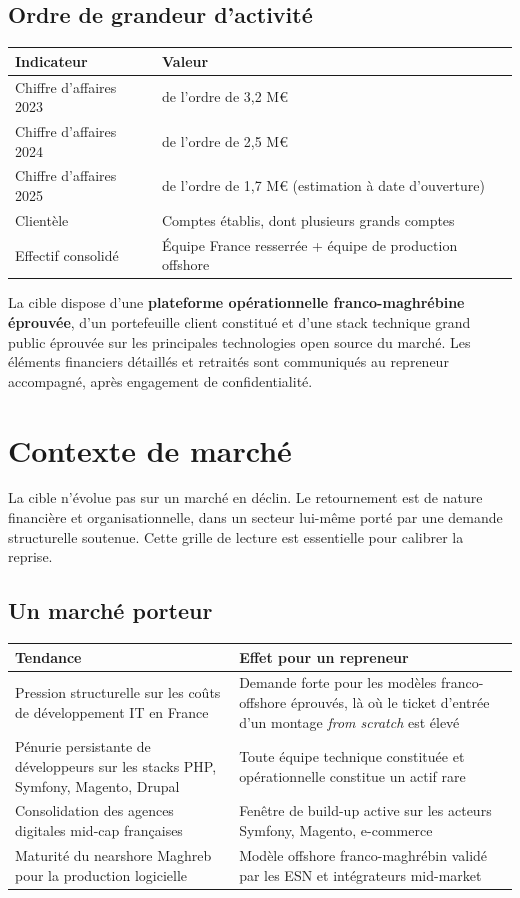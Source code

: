 \documentclass[11pt,a4paper]{article}
\begin{document}
\subsection*{Ordre de grandeur d'activité}

\begin{tabular}{L{6cm}L{8cm}}
\toprule
\textbf{Indicateur} & \textbf{Valeur} \\
\midrule
Chiffre d'affaires 2023 & de l'ordre de 3,2 M\euro{} \\
Chiffre d'affaires 2024 & de l'ordre de 2,5 M\euro{} \\
Chiffre d'affaires 2025 & de l'ordre de 1,7 M\euro{} (estimation à date d'ouverture) \\
Clientèle & Comptes établis, dont plusieurs grands comptes \\
Effectif consolidé & Équipe France resserrée + équipe de production offshore \\
\bottomrule
\end{tabular}

La cible dispose d'une \textbf{plateforme opérationnelle franco-maghrébine éprouvée}, d'un portefeuille client constitué et d'une stack technique grand public éprouvée sur les principales technologies open source du marché. Les éléments financiers détaillés et retraités sont communiqués au repreneur accompagné, après engagement de confidentialité.

\section{Contexte de marché}

La cible n'évolue pas sur un marché en déclin. Le retournement est de nature financière et organisationnelle, dans un secteur lui-même porté par une demande structurelle soutenue. Cette grille de lecture est essentielle pour calibrer la reprise.

\subsection{Un marché porteur}

\begin{longtable}{L{6.5cm}L{8.5cm}}
\toprule
\textbf{Tendance} & \textbf{Effet pour un repreneur} \\
\midrule
\endhead
Pression structurelle sur les coûts de développement IT en France & Demande forte pour les modèles franco-offshore éprouvés, là où le ticket d'entrée d'un montage \textit{from scratch} est élevé \\
Pénurie persistante de développeurs sur les stacks PHP, Symfony, Magento, Drupal & Toute équipe technique constituée et opérationnelle constitue un actif rare \\
Consolidation des agences digitales mid-cap françaises & Fenêtre de build-up active sur les acteurs Symfony, Magento, e-commerce \\
Maturité du nearshore Maghreb pour la production logicielle & Modèle offshore franco-maghrébin validé par les ESN et intégrateurs mid-market \\
\bottomrule
\end{longtable}
\end{document}
